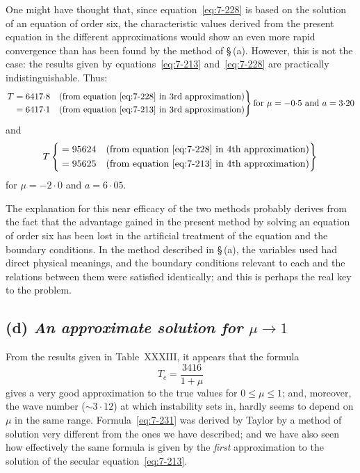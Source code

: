 One might have thought that, since equation~\eqref{eq:7-228} is based on the
solution of an equation of order six, the characteristic values derived
from the present equation in the different approximations would show
an even more rapid convergence than has been found by the method of
\S\,(a).  However, this is not the case: the results given by equations~\eqref{eq:7-213}
and~\eqref{eq:7-228} are practically indistinguishable.  Thus:
\begin{equation}
\label{eq:7-230}
\left.
\begin{aligned}
T &= 6417{\cdot}8 &&\text{(from equation~\eqref{eq:7-228} in 3rd approximation)}\\
  &= 6417{\cdot}1 &&\text{(from equation~\eqref{eq:7-213} in 3rd approximation)}
\end{aligned}
\right\}\\
\text{for } \mu = -0{\cdot}5 \text{ and } a = 3{\cdot}20
\end{equation}
and
\begin{equation*}
T\left\{
\begin{aligned}
&= 95624 &&\text{(from equation~\eqref{eq:7-228} in 4th approximation)}\\
&= 95625 &&\text{(from equation~\eqref{eq:7-213} in 4th approximation)}
\end{aligned}
\right\}\\
\end{equation*}
for $\mu = -2{\cdot}0$ and $a = 6{\cdot}05$.

The explanation for this near efficacy of the two methods probably
derives from the fact that the advantage gained in the present method
by solving an equation of order six has been lost in the artificial treatment
of the equation and the boundary conditions.  In the method described
in \S\,(a), the variables used had direct physical meanings, and the
boundary conditions relevant to each and the relations between them
were satisfied identically; and this is perhaps the real key to the problem.

\subsection*{(d) \emph{An approximate solution for $\mu \to 1$}}
From the results given in Table~XXXIII, it appears that the formula
\begin{equation}
\label{eq:7-231}
T_c = \frac{3416}{1+\mu}
\end{equation}
gives a very good approximation to the true values for $0 \leqslant \mu \leqslant 1$;
and, moreover, the wave number ($\sim 3{\cdot}12$) at which instability sets in,
hardly seems to depend on $\mu$ in the same range.  Formula~\eqref{eq:7-231} was
derived by Taylor by a method of solution very different from the ones
we have described; and we have also seen how effectively the same
formula is given by the \emph{first} approximation to the solution of the secular
equation~\eqref{eq:7-213}.

